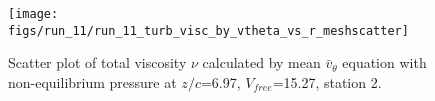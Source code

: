\begin{figure}[H]
\centering
\texttt{[image: figs/run\_11/run\_11\_turb\_visc\_by\_vtheta\_vs\_r\_meshscatter]}
\caption{Scatter plot of total viscosity $\nu$ calculated by mean $\bar{v}_{\theta}$ equation with non-equilibrium pressure at $z/c$=6.97, $V_{free}$=15.27, station 2.}
\label{fig:run_11_turb_visc_by_vtheta_vs_r_meshscatter}
\end{figure}


